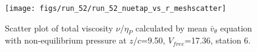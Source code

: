 \begin{figure}[H]
\centering
\texttt{[image: figs/run\_52/run\_52\_nuetap\_vs\_r\_meshscatter]}
\caption{Scatter plot of total viscosity $\nu / \eta_P$ calculated by mean $\bar{v}_{\theta}$ equation with non-equilibrium pressure at $z/c$=9.50, $V_{free}$=17.36, station 6.}
\label{fig:run_52_nuetap_vs_r_meshscatter}
\end{figure}


